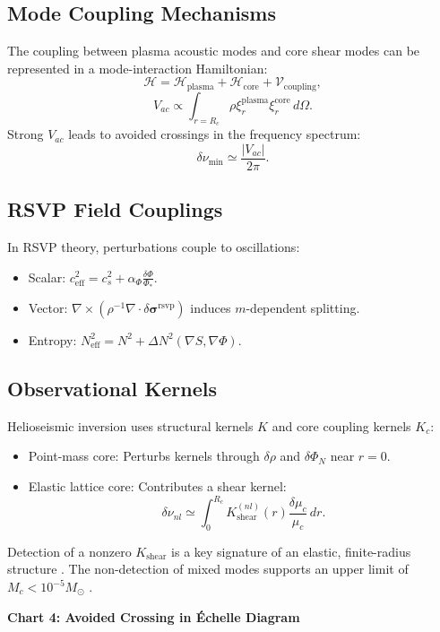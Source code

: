 \documentclass{article}
\begin{document}
\subsection{Mode Coupling Mechanisms}

The coupling between plasma acoustic modes and core shear modes can be represented in a mode-interaction Hamiltonian:
\[
\mathcal{H} = \mathcal{H}_{\text{plasma}} + \mathcal{H}_{\text{core}} + \mathcal{V}_{\text{coupling}},
\]
\[
V_{ac} \propto \int_{r=R_c} \rho \xi_r^{\text{plasma}} \xi_r^{\text{core}} \, d\Omega.
\]
Strong $V_{ac}$ leads to avoided crossings in the frequency spectrum:
\[
\delta \nu_{\min} \simeq \frac{|V_{ac}|}{2\pi}.
\]

\subsection{RSVP Field Couplings}

In RSVP theory, perturbations couple to oscillations:
\begin{itemize}
\item Scalar: $c_{\text{eff}}^2 = c_s^2 + \alpha_\Phi \frac{\delta \Phi}{\Phi_*}$.
\item Vector: $\nabla \times (\rho^{-1} \nabla \cdot \delta \boldsymbol{\sigma}^{\text{rsvp}})$ induces $m$-dependent splitting.
\item Entropy: $N_{\text{eff}}^2 = N^2 + \Delta N^2 (\nabla S, \nabla \Phi)$.
\end{itemize}

\subsection{Observational Kernels}

Helioseismic inversion uses structural kernels $K$ and core coupling kernels $K_c$:
\begin{itemize}
\item Point-mass core: Perturbs kernels through $\delta \rho$ and $\delta \Phi_N$ near $r=0$.
\item Elastic lattice core: Contributes a shear kernel:
\[
\delta \nu_{nl} \simeq \int_0^{R_c} K_{\text{shear}}^{(nl)}(r) \frac{\delta \mu_c}{\mu_c} \, dr.
\]
\end{itemize}
Detection of a nonzero $K_{\text{shear}}$ is a key signature of an elastic, finite-radius structure \citep{aerts2010}. The non-detection of mixed modes supports an upper limit of $M_c < 10^{-5} M_\odot$ \citep{lund2017}.

\textbf{Chart 4: Avoided Crossing in Échelle Diagram}
\end{document}
